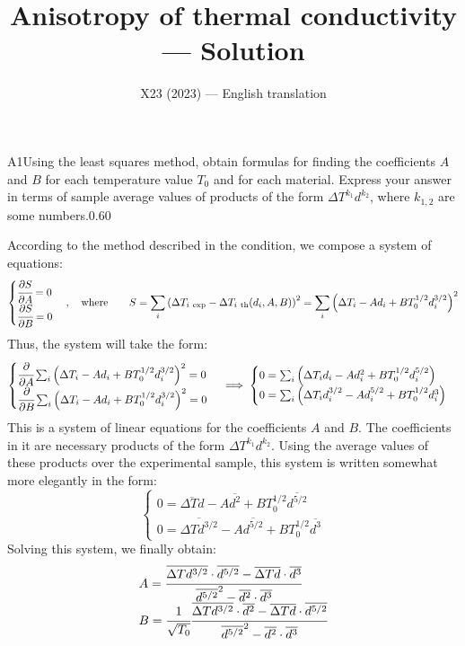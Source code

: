 \documentclass[11pt,a4paper]{article}
\title{\textbf{Anisotropy of thermal conductivity --- Solution}}
\author{\normalsize X23 (2023) — English translation}
\date{}
\begin{document}
\maketitle\vspace{-0.5em}
\begin{solcard}{A1}{Using the least squares method, obtain formulas for finding the coefficients $A$ and $B$ for each temperature value $T_0$ and for each material. Express your answer in terms of sample average values of products of the form $\Delta T^{k_1}d^{k_2}$, where $k_{1,2}$ are some numbers.}{0.60}

According to the method described in the condition, we compose a system of equations:\[\begin{cases} \cfrac{\partial S}{\partial A}=0\\ \cfrac{\partial S}{\partial B}=0\end{cases}, \quad  \text{where} \quad\quad S=\sum_i\left(\Delta T_{i\ \mathrm{exp}}-\Delta T_{i\ \mathrm{th}}(d_i, A, B)\right)^2=\sum_i\left(\Delta T_i-Ad_i+BT_0^{1/2}d_i^{3/2}\right)^2\]Thus, the system will take the form:\[\begin{cases} \cfrac\partial{\partial A}\sum_i\left(\Delta T_i-Ad_i+BT_0^{1/2}d_i^{3/2}\right)^2=0\\\cfrac\partial{\partial B}\sum_i\left(\Delta T_i-Ad_i+BT_0^{1/2}d_i^{3/2}\right)^2=0\end{cases}\implies\begin{cases}0=\sum_i\left(\Delta T_id_i-Ad_i^2+BT_0^{1/2}d_i^{5/2}\right)\\0=\sum_i\left(\Delta T_id_i^{3/2}-Ad_i^{5/2}+BT_0^{1/2}d_i^3\right)\end{cases}\]This is a system of linear equations for the coefficients $A$ and $B$. The coefficients in it are necessary products of the form $\Delta T^{k_1}d^{k_2}$. Using the average values of these products over the experimental sample, this system is written somewhat more elegantly in the form:\[\begin{cases}0=\overline{\Delta Td}-A\overline{d^2}+BT_0^{1/2}\overline{d^{5/2}}\\0=\overline{\Delta Td^{3/2}}-A\overline{d^{5/2}}+BT_0^{1/2}\overline{d^3}\end{cases}\]Solving this system, we finally obtain:\[\begin{array}{l}A=\cfrac{\overline{\Delta Td^{3/2}}\cdot\overline{d^{5/2}}-\overline{\Delta Td}\cdot\overline{d^3}}{\overline{d^{5/2}}^2-\overline{d^2}\cdot\overline{d^3}}\\B=\cfrac1{\sqrt{T_0}}\cfrac{\overline{\Delta Td^{3/2}}\cdot\overline{d^2}-\overline{\Delta Td}\cdot\overline{d^{5/2}}}{\overline{d^{5/2}}^2-\overline{d^2}\cdot\overline{d^3}}\end{array}\]


\end{solcard}
\end{document}
